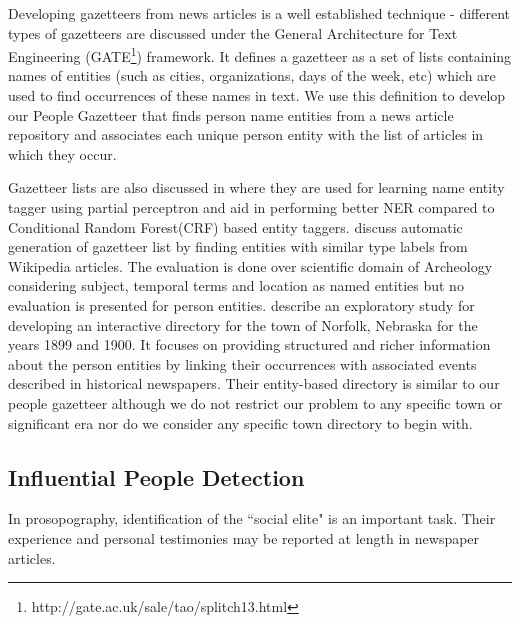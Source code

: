 Developing gazetteers from news articles is a well established technique - different types of gazetteers are discussed under the General Architecture for Text Engineering (GATE\footnote{http://gate.ac.uk/sale/tao/splitch13.html}) framework. It defines a gazetteer as a set of lists containing names of entities (such as cities, organizations, days of the week, etc) which are used to find occurrences of these names in text. We use this definition to develop our People Gazetteer that finds person name entities from a news article repository and associates each unique person entity with the list of articles in which they occur.

Gazetteer lists are also discussed in \cite{carlson2009learning} where they are used for learning name entity tagger using partial perceptron and aid in performing better NER compared to Conditional Random Forest(CRF) based entity taggers. \cite{zhang2009novel} discuss automatic generation of gazetteer list by finding entities with similar type labels from Wikipedia articles. The evaluation is done over scientific domain of Archeology considering subject, temporal terms and location as named entities but no evaluation is presented for person entities. \cite{allen2013toward} describe an exploratory study for developing an interactive directory for the town of Norfolk, Nebraska for the years 1899 and 1900. It focuses on providing structured and richer information about the person entities by linking their occurrences with associated events described in historical newspapers. Their entity-based directory is similar to our people gazetteer although we do not restrict our problem to any specific town or significant era nor do we consider any specific town directory to begin with. 

\subsection{Influential People Detection}
In prosopography, identification of the ``social elite" is an important task. Their experience and personal testimonies may be reported at length in newspaper articles. 

